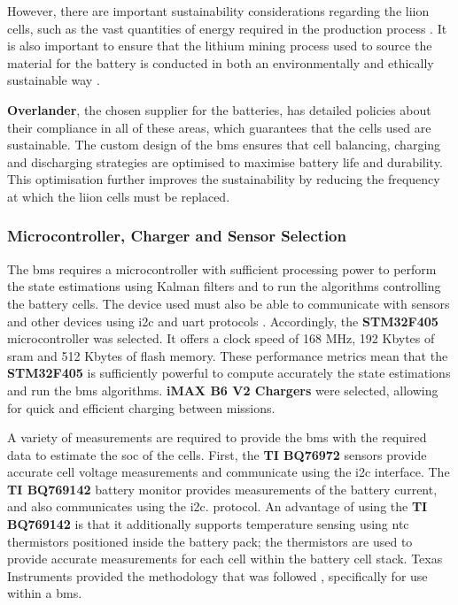 However, there are important sustainability considerations regarding the \acrshort{liion} cells, such as the vast quantities of energy required in the production process \cite{environments12010024}. It is also important to ensure that the lithium mining process used to source the material for the battery is conducted in both an environmentally and ethically sustainable way \cite{EnergyFuturesLab_2022}. 

\textbf{Overlander}, the chosen supplier for the batteries, has detailed policies about their compliance in all of these areas, which guarantees that the cells used are sustainable. The custom design of the \gls{bms} ensures that cell balancing, charging and discharging strategies are optimised to maximise battery life and durability. This optimisation further improves the sustainability by reducing the frequency at which the \acrshort{liion} cells must be replaced. 

\subsubsection{Microcontroller, Charger and Sensor Selection}
\label{microcon}

The \acrshort{bms} requires a microcontroller with sufficient processing power to perform the state estimations using Kalman filters and to run the algorithms controlling the battery cells. The device used must also be able to communicate with sensors and other devices using \gls{i2c} and \gls{uart} protocols \cite{Denggao2022}. Accordingly, the \textbf{STM32F405} microcontroller was selected. It offers a clock speed of 168 MHz, 192 Kbytes of \gls{sram} and 512 Kbytes of flash memory. These performance metrics mean that the \textbf{STM32F405} is sufficiently powerful to compute accurately the state estimations and run the \acrshort{bms} algorithms. \textbf{iMAX B6 V2 Chargers} were selected, allowing for quick and efficient charging between missions.

A variety of measurements are required to provide the \acrshort{bms} with the required data to estimate the \gls{soc} of the cells. First, the \textbf{TI BQ76972} sensors provide accurate cell voltage measurements and communicate using the \acrshort{i2c} interface. The \textbf{TI BQ769142} battery monitor provides measurements of the battery current, and also communicates using the \acrshort{i2c}. protocol. An advantage of using the \textbf{TI BQ769142} is that it additionally supports temperature sensing using \gls{ntc} thermistors positioned inside the battery pack; the thermistors are used to provide accurate measurements for each cell within the battery cell stack. Texas Instruments provided the methodology that was followed \cite{TI_SNIA032}, specifically for use within a \gls{bms}.


